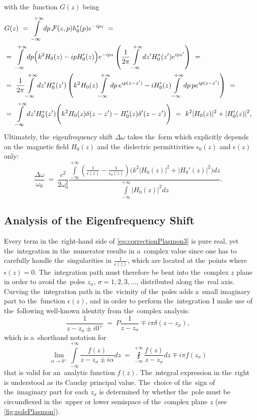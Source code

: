 with the~function $G(z)$ being
\begin{align}
&G(z)~=~\int\limits_{-\infty}^{+\infty} dp\,{\mathcal F}(z,p) h_0^*(p) e^{-ipz}~=\\
&=~\int\limits_{-\infty}^{+\infty}dp \Big(k^2 H_0(z)-ip H_0'(z)\Big)e^{-ipz}\left(\frac{1}{2\pi}\int\limits_{-\infty}^{+\infty} dz'H_0^{*}(z')e^{ipz'}\right)~=\notag\\
&=~\frac{1}{2\pi} \int\limits_{-\infty}^{+\infty}dz' H_0^{*}(z')\left(k^2H_0(z)\int\limits_{-\infty}^{+\infty}dp\,e^{ip(z-z')} - iH_0'(z) \int\limits_{-\infty}^{+\infty}dp\,pe^{ip(z-z')}\right)~=\notag\\
&=~\int\limits_{-\infty}^{+\infty}dz' H_0^{*}(z')\Bigg(k^2H_0(z)\delta(z-z')-H_0'(z)\delta'(z-z')\Bigg)~=~k^2|H_0(z)|^2+|H_0'(z)|^2,\notag
\end{align}
Ultimately, the~eigenfrequency shift $\Delta\omega$ takes the~form which explicitly depends on the~magnetic field $H_0(z)$ and the~dielectric permittivities $\epsilon_0(z)$ and $\epsilon(z)$ only:
\begin{equation}
\label{eq:correctionPlasmon3}
\frac{\Delta\omega}{\omega_0}~=~\frac{c^2}{2\omega_0^2}\frac{\int\limits_{-\infty}^{+\infty}\left(\frac{1}{\epsilon(z)}-\frac{1}{\epsilon_0(z)}\right) \Big(k^2|H_0(z)|^2+|H_0'(z)|^2\Big)dz}{\int\limits_{-\infty}^{+\infty} |H_0(z)|^2 dz}.
\end{equation}


\subsection{Analysis of the Eigenfrequency Shift}

Every term in the~right-hand side of \eqref{eq:correctionPlasmon3} is pure real, yet the~integration in the~numerator results in a~complex value since one has to carefully handle the~singularities in $\frac{1}{\epsilon(z)}$, which are located at the~points where $\epsilon(z)=0$.
The~integration path must therefore be bent into the~complex $z$ plane in order to avoid the~poles $z_\sigma$, $\sigma=1,2,3,...$, distributed along the~real axis.
Curving the~integration path in the~vicinity of the~poles adds a~small imaginary part to the~function $\epsilon(z)$, and in order to perform the~integration I make use of the~following well-known identity from the~complex analysis:
\begin{equation}
\frac{1}{z-z_\sigma\pm i 0^{+}}~=~P\frac{1}{z-z_\sigma}\mp i\pi\delta(z-z_\sigma),
\end{equation}
which is a~shorthand notation for
\begin{equation}
\label{eq:plemel}
\lim_{\alpha\to 0^{+}} \int\limits_{-\infty}^{+\infty}\frac{f(z)}{z-z_\sigma\pm i\alpha}dz~=~\fint\limits_{-\infty}^{+\infty}\frac{f(z)}{z-z_\sigma}dz \mp i\pi f(z_\sigma)
\end{equation}
that is valid for an~analytic function $f(z)$.
The~integral expression in the~right is understood as its Cauchy principal value.
The~choice of the~sign of the~imaginary part for each $z_\sigma$ is determined by whether the~pole must be circumflexed in the~upper or lower semispace of the~complex plane $z$ (see \cref{fig:polePlasmon}).

